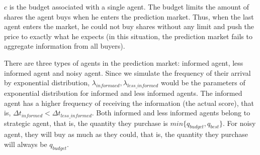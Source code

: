 \documentclass{article}
\begin{document}
$c$ is the budget associated with a single agent. The budget limits the amount of shares the agent buys when he enters the prediction market. Thus, when the last agent enters the market, he could not buy shares without any limit and push the price to exactly what he expects (in this situation, the prediction market fails to aggregate information from all buyers).

There are three types of agents in the prediction market: informed agent, less informed agent and noisy agent. Since we simulate the frequency of their arrival by exponential distribution, $\lambda_{informaed}, \lambda_{less\_ informed}$ would be the parameters of exponential distribution for informed and less informed agents. The informed agent has a higher frequency of receiving the information (the actual score),  that is, $\Delta t_{informed}<\Delta t_{less\_informed}$. Both informed and less informed agents belong to strategic agent, that is, the quantity they purchase is $min\{q_{budget}, q_{best}\}$. For noisy agent, they will buy as much as they could, that is, the quantity they purchase will always be $q_{budget}$. 
\end{document}
